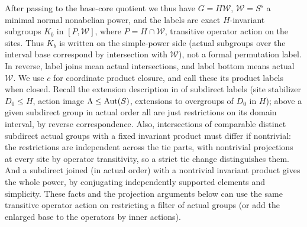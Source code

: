 \begin{convention}\label{t:weighted-power}
After passing to the base-core quotient we thus have \(G=H\mathcal W\), \(\mathcal W=S^s\) a
minimal normal nonabelian power, and the labels are exact \(H\)-invariant subgroups \(K_b\) in
\([P,\mathcal W]\), where \(P=H\cap\mathcal W\), transitive operator action on the sites. Thus
\(K_b\) is written on the simple-power side (actual subgroups over the interval base correspond by
intersection with \(\mathcal W\)), not a formal permutation label. In reverse, label joins mean
actual intersections, and label bottom means actual \(\mathcal W\). We use \(c\) for coordinate
product closure, and call these its product labels when closed. Recall the extension description
in  of subdirect labels (site stabilizer \(D_0\le H\), action image \(\Lambda\le
{\rm Aut}(S)\), extensions to overgroups of \(D_0\) in \(H\)); above a given subdirect group in
actual order all are just restrictions on its domain interval, by reverse correspondence. Also,
intersections of comparable distinct subdirect actual groups with a fixed invariant product must
differ if nontrivial: the restrictions are independent across the tie parts, with nontrivial
projections at every site by operator transitivity, so a strict tie change distinguishes them. And
a subdirect joined (in actual order) with a nontrivial invariant product gives the whole power, by
conjugating independently supported elements and simplicity. These facts and the projection
arguments below can use the same transitive operator action on restricting a filter of actual
groups (or add the enlarged base to the operators by inner actions).
\end{convention}

